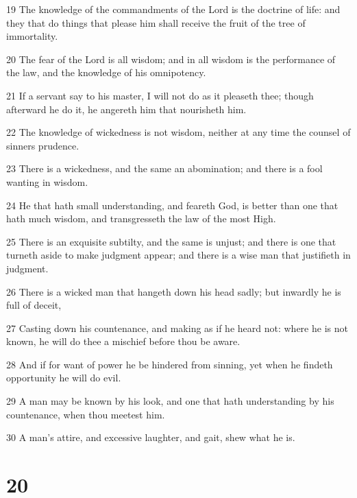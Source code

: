 \par 19 The knowledge of the commandments of the Lord is the doctrine of life: and they that do things that please him shall receive the fruit of the tree of immortality.
\par 20 The fear of the Lord is all wisdom; and in all wisdom is the performance of the law, and the knowledge of his omnipotency.
\par 21 If a servant say to his master, I will not do as it pleaseth thee; though afterward he do it, he angereth him that nourisheth him.
\par 22 The knowledge of wickedness is not wisdom, neither at any time the counsel of sinners prudence.
\par 23 There is a wickedness, and the same an abomination; and there is a fool wanting in wisdom.
\par 24 He that hath small understanding, and feareth God, is better than one that hath much wisdom, and transgresseth the law of the most High.
\par 25 There is an exquisite subtilty, and the same is unjust; and there is one that turneth aside to make judgment appear; and there is a wise man that justifieth in judgment.
\par 26 There is a wicked man that hangeth down his head sadly; but inwardly he is full of deceit,
\par 27 Casting down his countenance, and making as if he heard not: where he is not known, he will do thee a mischief before thou be aware.
\par 28 And if for want of power he be hindered from sinning, yet when he findeth opportunity he will do evil.
\par 29 A man may be known by his look, and one that hath understanding by his countenance, when thou meetest him.
\par 30 A man's attire, and excessive laughter, and gait, shew what he is.

\chapter{20}

